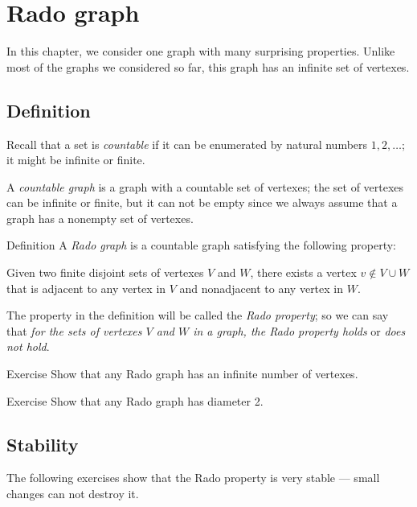 \chapter{Rado graph}

In this chapter, we consider one graph with many surprising properties.
Unlike most of the graphs we considered so far, this graph has an infinite set of vertexes.

\section*{Definition}

Recall that a set is \emph{countable} if it can be enumerated by natural numbers $1,2,\dots$;
it might be infinite or finite.

A \emph{countable graph} is a graph with a countable set of vertexes;
the set of vertexes can be infinite or finite, but it can not be empty since we always assume that a graph has a nonempty set of vertexes.


\begin{thm}{Definition}
A \emph{Rado graph} is a countable graph satisfying the following property:

Given two finite disjoint sets of vertexes $V$ and $W$, there exists a
vertex $v\notin V\cup W$ that is adjacent to any vertex in $V$ and nonadjacent to any vertex in $W$.
\end{thm}

The property in the definition will be called the \emph{Rado property}; so we can say that \emph{for the sets of vertexes $V$ and $W$ in a graph, the Rado property holds} or \emph{does not hold}.

\begin{thm}{Exercise}
Show that any Rado graph has an infinite number of vertexes. 
\end{thm}

\begin{thm}{Exercise}
Show that any Rado graph has diameter 2.
\end{thm}

\section*{Stability}

The following exercises show that the Rado property is very stable --- 
small changes can not destroy it.


